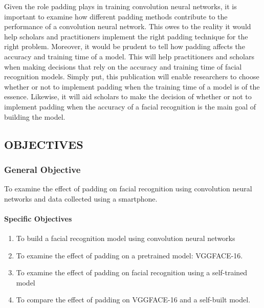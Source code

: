 \documentclass[
  12pt,
]{article}
\providecommand{\tightlist}{%
  \setlength{\itemsep}{0pt}\setlength{\parskip}{0pt}}
\begin{document}
Given the role padding plays in training convolution neural networks, it
is important to examine how different padding methods contribute to the
performance of a convolution neural network. This owes to the reality it
would help scholars and practitioners implement the right padding
technique for the right problem. Moreover, it would be prudent to tell
how padding affects the accuracy and training time of a model. This will
help practitioners and scholars when making decisions that rely on the
accuracy and training time of facial recognition models. Simply put,
this publication will enable researchers to choose whether or not to
implement padding when the training time of a model is of the essence.
Likewise, it will aid scholars to make the decision of whether or not to
implement padding when the accuracy of a facial recognition is the main
goal of building the model.

\subsection{OBJECTIVES}\label{objectives}

\subsubsection{General Objective}\label{general-objective}

To examine the effect of padding on facial recognition using convolution
neural networks and data collected using a smartphone.

\paragraph{Specific Objectives}\label{specific-objectives}

\begin{enumerate}
\def\labelenumi{\arabic{enumi}.}
\tightlist
\item
  To build a facial recognition model using convolution neural networks
\item
  To examine the effect of padding on a pretrained model: VGGFACE-16.
\item
  To examine the effect of padding on facial recognition using a
  self-trained model
\item
  To compare the effect of padding on VGGFACE-16 and a self-built model.
\end{enumerate}
\end{document}
